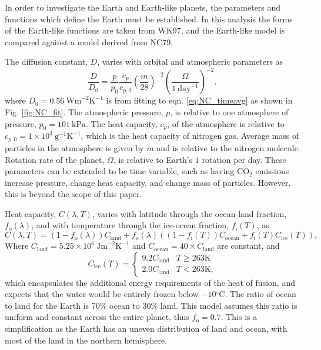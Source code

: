 \documentclass[12pt, onecolumn]{revtex4-2}    %
\newcommand{\heatcap}{\ensuremath{\ \text{Jm}^{-2} \text{K}^{-1}}}
\newcommand{\diffusion}{\ensuremath{\ \text{Wm}^{-2} \text{K}^{-1}}}
\newcommand{\degrees}{\ensuremath{^{\circ}}}
\begin{document}
In order to investigate the Earth and Earth-like planets, the parameters and functions which define the Earth must be established.
In this analysis the forms of the Earth-like functions are taken from WK97, and the Earth-like model is compared against a model derived from NC79.


The diffusion constant, $D$, varies with orbital and atmospheric parameters as
\begin{equation}
  \frac{D}{D_0} = \frac{p}{p_0} \frac{c_p}{c_{p,0}} \left(\frac{m}{28}\right)^{-2} \left(\frac{\Omega}{1\ \text{day}^{-1}}\right)^{-2},
  \label{eq:diffusion_eqn}
\end{equation}
where $D_0 = 0.56 \diffusion$ is from fitting to eqn. \eqref{eq:NC_timeavg} as shown in Fig. \ref{fig:NC_fit}.
The atmospheric pressure, $p$, is relative to one atmosphere of pressure, $p_0 = 101 \ \text{kPa}$.
The heat capacity, $c_p$, of the atmosphere is relative to $c_{p,0} = 1\times10^3 \ \text{g}^{-1} \text{K}^{-1}$, which is the heat capacity of nitrogen gas.
Average mass of particles in the atmosphere is given by $m$ and is relative to the nitrogen molecule.
Rotation rate of the planet, $\Omega$, is relative to Earth's $1$ rotation per day.
These parameters can be extended to be time variable, such as having CO$_2$ emissions increase pressure, change heat capacity, and change mass of particles.
However, this is beyond the scope of this paper.

Heat capacity, $C(\lambda, T)$, varies with latitude through the ocean-land fraction, $f_\text{o}(\lambda)$, and with temperature through the ice-ocean fraction, $f_\text{i}(T)$, as
\begin{equation}
  C(\lambda, T) = (1 - f_\text{o}(\lambda)) C_\text{land} + f_\text{o}(\lambda) ((1-f_\text{i}(T)) C_\text{ocean} + f_\text{i}(T) C_\text{ice}(T)),
  \label{eq:heat_capacity}
\end{equation}
Where $C_{\text{land}} = 5.25\times10^6 \heatcap$ and $C_{\text{ocean}} = 40 \times C_{\text{land}}$ are constant, and
\begin{equation}
  C_{\text{ice}}(T) =
  \begin{cases}
    9.2 C_\text{land} & T \ge 263\text{K} \\
    2.0 C_\text{land} & T < 263\text{K},
  \end{cases}
  \label{eq:heat_capacity_ice}
\end{equation}
which encapsulates the additional energy requirements of the heat of fusion, and expects that the water would be entirely frozen below $-10\degrees$C.
The ratio of ocean to land for the Earth is 70\% ocean to 30\% land.
This model assumes this ratio is uniform and constant across the entire planet, thus $f_\text{o} = 0.7$.
This is a simplification as the Earth has an uneven distribution of land and ocean, with most of the land in the northern hemisphere.
\end{document}
